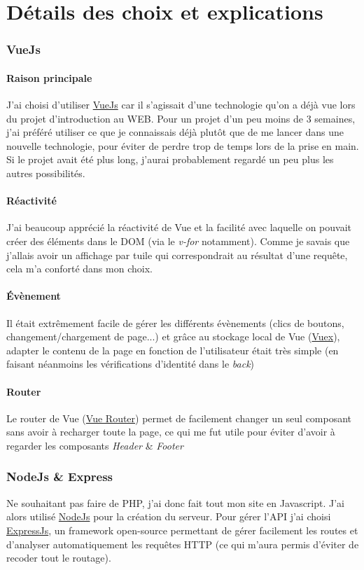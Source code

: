 \part{Détails des choix et explications}
\section{VueJs}
\subsection{Raison principale}
J'ai choisi d'utiliser \href{https://vuejs.org/}{VueJs} car il s'agissait d'une technologie qu'on a déjà vue lors du projet d'introduction au WEB. Pour un projet d'un peu moins de 3 semaines, j'ai préféré utiliser ce que je connaissais déjà plutôt que de me lancer dans une nouvelle technologie, pour éviter de perdre trop de temps lors de la prise en main. Si le projet avait été plus long, j'aurai probablement regardé un peu plus les autres possibilités.

\subsection{Réactivité}
J'ai beaucoup apprécié la réactivité de Vue et la facilité avec laquelle on pouvait créer des éléments dans le DOM (via le \textit{v-for} notamment). Comme je savais que j'allais avoir un affichage par tuile qui correspondrait au résultat d'une requête, cela m'a conforté dans mon choix.

\subsection{Évènement}
Il était extrêmement facile de gérer les différents évènements (clics de boutons, changement/chargement de page...) et grâce au stockage local de Vue (\href{https://vuex.vuejs.org/}{Vuex}), adapter le contenu de la page en fonction de l'utilisateur était très simple (en faisant néanmoins les vérifications d'identité dans le \textit{back})

\subsection{Router}
Le router de Vue (\href{https://router.vuejs.org/}{Vue Router}) permet de facilement changer un seul composant sans avoir à recharger toute la page, ce qui me fut utile pour éviter d'avoir à regarder les composants \textit{Header} \& \textit{Footer}
\section{NodeJs \& Express}
Ne souhaitant pas faire de PHP, j'ai donc fait tout mon site en Javascript. J'ai alors utilisé \href{https://nodejs.org/en/}{NodeJs} pour la création du serveur. Pour gérer l'API j'ai choisi \href{https://expressjs.com/}{ExpressJs}, un framework open-source permettant de gérer facilement les routes et d'analyser automatiquement les requêtes HTTP (ce qui m'aura permis d'éviter de recoder tout le routage).

